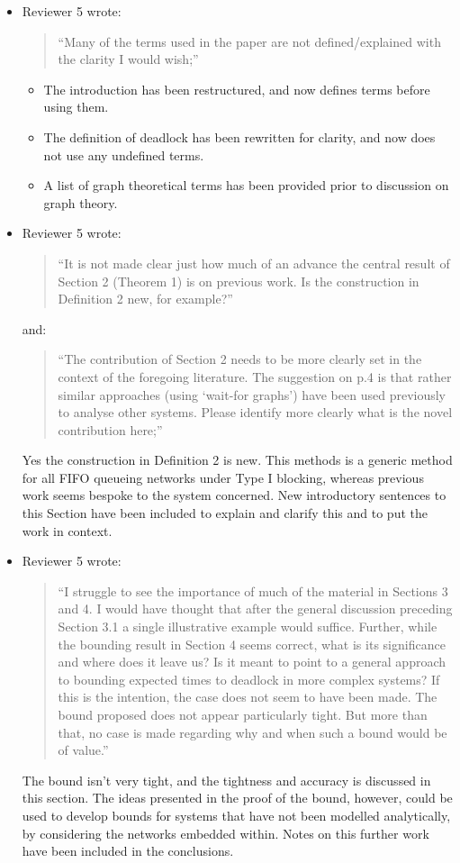 \documentclass{article}
\begin{document}
\begin{itemize}

\item Reviewer 5 wrote:
\begin{quote}
``Many of the terms used in the paper are not defined/explained with the
clarity I would wish;''
\end{quote}
\begin{itemize}
\item The introduction has been restructured, and now defines terms before
using them.
\item The definition of deadlock has been rewritten for clarity, and now does
not use any undefined terms.
\item A list of graph theoretical terms has been provided prior to discussion
on graph theory.
\end{itemize}


\item Reviewer 5 wrote:
\begin{quote}
``It is not made clear just how much of an advance the central result of
Section 2 (Theorem 1) is on previous work.
Is the construction in Definition 2 new, for example?''
\end{quote}

and:

\begin{quote}
``The contribution of Section 2 needs to be more clearly set in the context
of the foregoing literature.
The suggestion on p.4 is that rather similar approaches (using ‘wait-for
graphs’) have been used previously to analyse other systems.
Please identify more clearly what is the novel contribution here;''
\end{quote}

Yes the construction in Definition 2 is new.
This methods is a generic method for all FIFO queueing networks under Type I
blocking, whereas previous work seems bespoke to the system concerned.
New introductory sentences to this Section have been included to explain and
clarify this and to put the work in context.


\item Reviewer 5 wrote:
\begin{quote}
``I struggle to see the importance of much of the material in Sections 3 and 4.
I would have thought that after the general discussion preceding Section 3.1
a single illustrative example would suffice.
Further, while the bounding result in Section 4 seems correct, what is its
significance and where does it leave us?
Is it meant to point to a general approach to bounding expected times to
deadlock in more complex systems?
If this is the intention, the case does not seem to have been made.
The bound proposed does not appear particularly tight.
But more than that, no case is made regarding why and when such a bound
would be of value.''
\end{quote}
The bound isn't very tight, and the tightness and accuracy is discussed in
this section.
The ideas presented in the proof of the bound, however, could be used to
develop bounds for systems that have not been modelled analytically, by
considering the networks embedded within.
Notes on this further work have been included in the conclusions.


\end{itemize}
\end{document}
